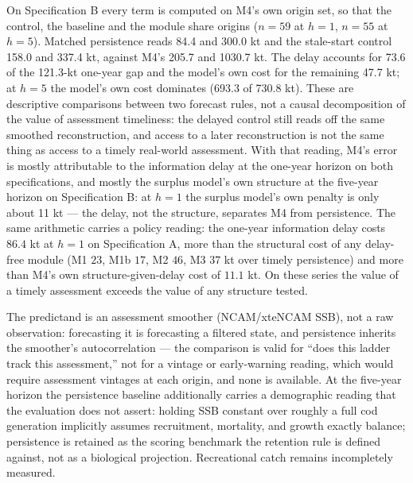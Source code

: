 \documentclass[11pt]{article}
\begin{document}
On Specification B every term is computed on M4's own origin set, so
that the control, the baseline and the module share origins (\(n=59\)
at \(h=1\), \(n=55\) at \(h=5\)). Matched persistence reads 84.4 and
300.0 kt and the stale-start control 158.0 and 337.4 kt, against M4's
205.7 and 1030.7 kt. The delay accounts for 73.6 of the 121.3-kt
one-year gap and the model's own cost for the remaining 47.7 kt; at
\(h = 5\) the model's own cost dominates (693.3 of 730.8 kt). These are descriptive comparisons between two
forecast rules, not a causal decomposition of the value of assessment
timeliness: the delayed control still reads off the same smoothed
reconstruction, and access to a later reconstruction is not the same
thing as access to a timely real-world assessment. With that reading,
M4's error is mostly attributable to the information delay at the
one-year horizon on both specifications, and mostly the surplus model's own structure at the
five-year horizon on Specification B: at \(h = 1\) the surplus model's
own penalty is only about 11 kt --- the delay, not the structure,
separates M4 from persistence. The same arithmetic carries a policy reading: the one-year information
delay costs \(86.4\) kt at \(h = 1\) on Specification A, more than the
structural cost of any delay-free module (M1 \(23\), M1b \(17\), M2
\(46\), M3 \(37\) kt over timely persistence) and more than M4's own
structure-given-delay cost of \(11.1\) kt. On these series the value of
a timely assessment exceeds the value of any structure tested.

The predictand is an assessment smoother (NCAM/xteNCAM SSB), not a raw
observation: forecasting it is forecasting a filtered state, and
persistence inherits the smoother's autocorrelation --- the comparison
is valid for ``does this ladder track this assessment,'' not for a
vintage or early-warning reading, which would require assessment
vintages at each origin, and none is available. At the five-year horizon
the persistence baseline additionally carries a demographic reading that
the evaluation does not assert: holding SSB constant over roughly a full
cod generation implicitly assumes recruitment, mortality, and growth
exactly balance; persistence is retained as the scoring benchmark the
retention rule is defined against, not as a biological projection.
Recreational catch remains incompletely measured.
\end{document}
